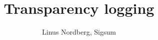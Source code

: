 \documentclass[aspectratio=169]{beamer}
\title{%
	Transparency logging
}
\author{%
	Linus Nordberg, Sigsum
}
\begin{document}
	\begin{frame}
		\titlepage
	\end{frame}

	
\end{document}
